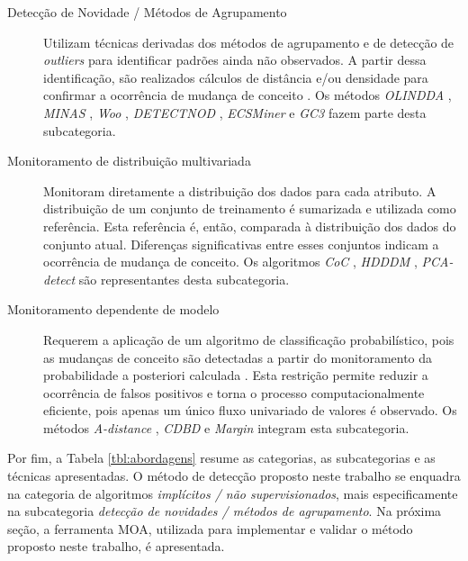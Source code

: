 \documentclass[msc, classic, a4paper]{ufbathesis}
\begin{document}
\begin{description}
    \item[Detecção de Novidade / Métodos de Agrupamento]
    Utilizam técnicas derivadas dos métodos de agrupamento e de detecção de \textit{outliers} para identificar padrões ainda não observados.
    A partir dessa identificação, são realizados cálculos de distância e/ou densidade para confirmar a ocorrência de mudança de conceito \cite{Ryu:Kantardzic:2012}.
    Os métodos
    \textit{OLINDDA} \cite{Spinosa:2007:OCA:1244002.1244107},
    \textit{MINAS} \cite{Faria:2013:NDA:2480362.2480515},
    \textit{Woo} \cite{Ryu:Kantardzic:2012},
    \textit{DETECTNOD} \cite{Hashemi:Hayat:DETECTNOD:2010},
    \textit{ECSMiner} \cite{Masud:2011:CNC:1978259.1978529} e
    \textit{GC3} \cite{Sethi2016b:GC3} fazem parte desta subcategoria.

    \item[Monitoramento de distribuição multivariada]
    Monitoram diretamente a distribuição dos dados para cada atributo.
    A distribuição de um conjunto de treinamento é sumarizada e utilizada como referência.
    Esta referência é, então, comparada à distribuição dos dados do conjunto atual.
    Diferenças significativas entre esses conjuntos indicam a ocorrência de mudança de conceito.
    Os algoritmos
    \textit{CoC} \cite{Lee:Magoules:CoC:2012},
    \textit{HDDDM} \cite{Ditzler:Polikar:HDDDM:2011},
    \textit{PCA-detect} \cite{Kuncheva:PCADetect:20085}
    são representantes desta subcategoria.

    \item[Monitoramento dependente de modelo]
    Requerem a aplicação de um algoritmo de classificação probabilístico,
    pois as mudanças de conceito são detectadas a partir do monitoramento da probabilidade a posteriori calculada \cite{Zliobaite:2010}.
    Esta restrição permite reduzir a ocorrência de falsos positivos e torna o processo computacionalmente eficiente, pois apenas um único fluxo univariado de valores é observado.
    Os métodos
    \textit{A-distance} \cite{Dredze:ADistance:2010585},
    \textit{CDBD} \cite{Lindstrom:CDBD:2013} e
    \textit{Margin} \cite{Dries:Margin:2009} integram esta subcategoria.
\end{description}

Por fim, a Tabela \ref{tbl:abordagens} resume as categorias, as subcategorias e as técnicas apresentadas.
O método de detecção proposto neste trabalho se enquadra na categoria de algoritmos \textit{implícitos / não supervisionados}, mais especificamente na subcategoria \textit{detecção de novidades / métodos de agrupamento}.
Na próxima seção, a ferramenta MOA, utilizada para implementar e validar o método proposto neste trabalho, é apresentada.
\end{document}
